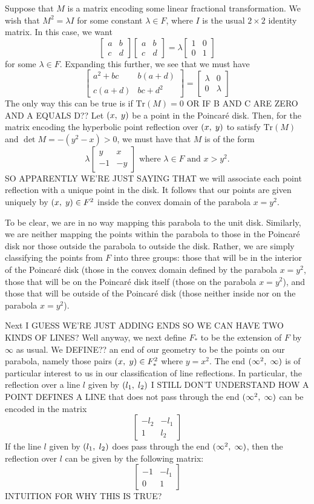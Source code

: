 \documentclass[12pt]{article}
\newcommand{\poincare}{Poincar\'{e} }
\newcommand{\Tr}{\text{Tr}}
\newcommand{\ttc}{, \hspace{1mm}}
\newcommand{\lftmat}[4]{\begin{bmatrix} {#1} & {#2} \\ {#3} & {#4} \end{bmatrix}}
\newcommand{\stanlftmat}{\lftmat{a}{b}{c}{d}}
\newcommand{\pointmat}[2]{\lftmat{{#2}}{{#1}}{-1}{-{#2}}}
\newcommand{\stanpointmat}{\pointmat{x}{y}}
\newcommand{\linenoendmat}[2]{\begin{bmatrix} -{#2} & -{#1} \\ 1 & {#2} \end{bmatrix}}
\newcommand{\stanlinenoendmat}{\linenoendmat{l_1}{l_2}}
\newcommand{\lineendmat}[2]{\begin{bmatrix} -1 & -{#1} \\ 0 & 1 \end{bmatrix}}
\newcommand{\stanlineendmat}{\lineendmat{l_1}{l_2}}
\newcommand{\specialend}{(\infty^2\ttc\infty)}
\begin{document}
Suppose that $M$ is a matrix encoding some linear fractional transformation. We wish that $M^2 = \lambda I$ for some constant $\lambda \in F$, where $I$ is the usual $2 \times 2$ identity matrix. In this case, we want
\[\stanlftmat \stanlftmat = \lambda \lftmat{1}{0}{0}{1}\]
for some $\lambda \in F$. Expanding this further, we see that we must have 
\[\lftmat{a^2 + bc}{b(a+d)}{c(a+d)}{bc+d^2} =  \lftmat{\lambda}{0}{0}{\lambda}\]
The only way this can be true is if $\Tr(M) = 0$ OR IF B AND C ARE ZERO AND A EQUALS D?? Let $(x \ttc y)$ be a point in the \poincare disk. Then, for the matrix encoding the hyperbolic point reflection over $(x \ttc y)$ to satisfy $\Tr(M)$ and $\det M = -(y^2 - x) > 0$, we must have that $M$ is of the form
\begin{equation} 
\lambda \stanpointmat \text{ where } \lambda \in F \text{ and } x > y^2. 
\end{equation}	
SO APPARENTLY WE'RE JUST SAYING THAT we will associate each point reflection with a unique point in the disk. It follows that our points are given uniquely by $(x \ttc y) \in F^2$ inside the convex domain of the parabola $x = y^2$.

To be clear, we are in no way mapping this parabola to the unit disk. Similarly, we are neither mapping the points within the parabola to those in the \poincare disk nor those outside the parabola to outside the disk. Rather, we are simply classifying the points from $F$ into three groups: those that will be in the interior of the \poincare disk (those in the convex domain defined by the parabola $x = y^2$, those that will be on the \poincare disk itself (those on the parabola $x = y^2$), and those that will be outside of the \poincare disk (those neither inside nor on the parabola $x = y^2$). 

Next I GUESS WE'RE JUST ADDING ENDS SO WE CAN HAVE TWO KINDS OF LINES? Well anyway, we next define $F_*$ to be the extension of $F$ by $\infty$ as usual. We DEFINE?? an end of our geometry to be the points on our parabola, namely those pairs $(x \ttc y) \in F_*^2$ where $y = x^2$. The end $\specialend$ is of particular interest to us in our classification of line reflections. In particular, the reflection over a line $l$ given by $(l_1\ttc l_2)$ I STILL DON'T UNDERSTAND HOW A POINT DEFINES A LINE that does not pass through the end $\specialend$ can be encoded in the matrix
\[\stanlinenoendmat\]
If the line $l$ given by $(l_1\ttc l_2)$ does pass through the end $\specialend$, then the reflection over $l$ can be given by the following matrix:
\[\stanlineendmat\]
INTUITION FOR WHY THIS IS TRUE?
\end{document}
